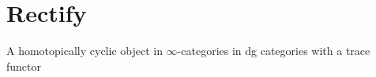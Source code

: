 \documentclass[12pt]{nuthesis}
\theoremstyle{definition}
\theoremstyle{remark}
\theoremstyle{example}
\begin{document}
	\section{Rectify}\label{sec:rectify}
		A homotopically cyclic object in $\infty$-categories in dg categories with a trace functor
	
	

\begin{singlespace}
\clearpage{} %

\end{singlespace}

\appendix		%



\end{document}
